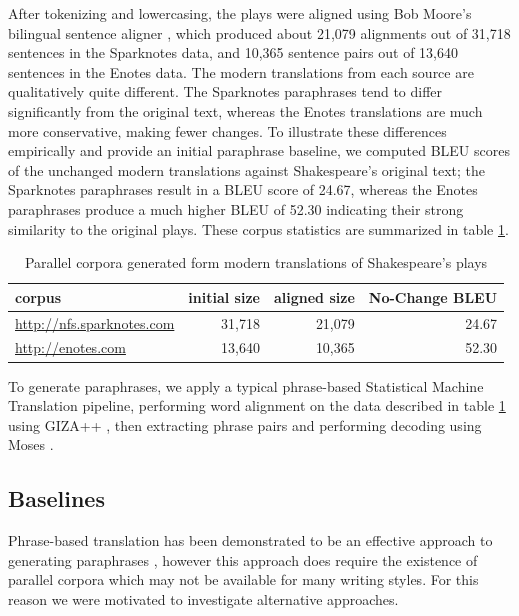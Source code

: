 \documentclass[10pt,a5paper,twoside]{article}
\begin{document}
After tokenizing and lowercasing, the plays were aligned using Bob Moore's bilingual sentence aligner \cite{Moore02}, which produced about 21,079 alignments out of 31,718 sentences in the Sparknotes data, and 10,365 sentence pairs out of 13,640 sentences in the Enotes data.  The modern translations from each source are qualitatively quite
different.  The Sparknotes paraphrases tend to differ significantly from the original text, whereas the Enotes translations are much more conservative, making fewer changes.
To illustrate these differences empirically and provide an initial paraphrase baseline, we computed BLEU scores of the unchanged modern translations against Shakespeare's 
original text; the Sparknotes paraphrases result in a BLEU score of 24.67, whereas the Enotes paraphrases produce a much higher BLEU of 52.30 indicating their strong similarity to the original plays.
These corpus statistics are summarized in table \ref{corpus_stats}.

\begin{table}
  \begin{center}
    \begin{tabular}{|l|r|r|r|}
      \hline
      corpus & initial size & aligned size & No-Change BLEU\\
      \hline
      \hline
      \url{http://nfs.sparknotes.com} & 31,718 & 21,079 & 24.67 \\
      \hline
      \url{http://enotes.com} & 13,640 & 10,365 & 52.30 \\
      \hline
    \end{tabular}
  \end{center}
  \caption{Parallel corpora generated form modern translations of Shakespeare's plays}
  \label{corpus_stats}
\end{table}

To generate paraphrases, we apply a typical phrase-based Statistical Machine Translation pipeline, performing
word alignment on the data described in table \ref{corpus_stats} using GIZA++ \cite{Och03}, then extracting phrase pairs and performing decoding using Moses \cite{Koehn07}.

\subsection{Baselines}
Phrase-based translation has been demonstrated to be an effective approach to generating paraphrases \cite{chen11,quirk04}, however this approach does require the existence of
parallel corpora which may not be available for many writing styles.  For this reason we were motivated to investigate alternative approaches.
\end{document}
